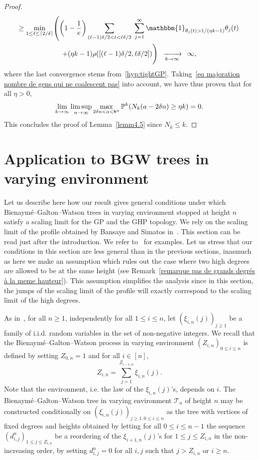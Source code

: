 \documentclass[10pt]{amsart}
\theoremstyle{definition}\newtheorem{defi}[theo]{Definition}\newtheorem{rema}[theo]{Remark}\newtheorem{exam}[theo]{Example}\newtheorem{exem}[theo]{Example}\newtheorem{nota}[theo]{Notation}
\newcommand{\cv}[1][n]{\enskip\xrightarrow[#1 \to \infty]{}\enskip}
\renewcommand{\P}{{\mathbb{P}}}
\newcommand{\1}{\mathbbm{1}}
\newcommand{\T}{\mathcal{T}}
\newcommand{\h}{\mathsf{h}}
\let\originalleft\left
\let\originalright\right
\renewcommand{\left}{\mathopen{}\mathclose\bgroup\originalleft}
\renewcommand{\right}{\aftergroup\egroup\originalright}
\renewcommand*{\to}{\mathchoice{\longrightarrow}{\rightarrow}{\rightarrow}{\rightarrow}}
\begin{document}
\begin{proof}
\begin{multline*}
\ge \min_{1 \le \ell \le \lceil 2/\delta \rceil}
\left(\left(1-\frac{1}{e} \right) \sum_{(\ell-1) \delta/2 < t < \ell \delta/2} \;\sum_{j=1}^\infty \1_{\theta_j(t)>1/(\eta k-1)} \theta_j(t)\right.\\
+ (\eta k-1) \rho([(\ell-1)\delta/2, \ell \delta/2])
\Biggr)\cv[k] \infty,
\end{multline*}
where the last convergence stems from~\ref{hyp:tightGP}. Taking~\eqref{eq majoration nombre de gens qui ne coalescent pas} into account, we have thus proven that for all $\eta>0$,
\[
\lim_{k\to \infty} \limsup_{n \to \infty} \max_{2 \delta n <a < \h^n} \P^k(N_k(a-2\delta n) \ge \eta k) = 0.
\]
This concludes the proof of Lemma~\ref{lemm4.5} since $N_k \le k$.
\end{proof}

\section{Application to BGW trees in varying environment} \label{sec:appBGWTVE}

Let us describe here how our result gives general conditions under which Bienaymé--Galton--Watson trees in varying environment stopped at height $n$ satisfy a scaling limit for the GP and the GHP topology. We rely on the scaling limit of the profile obtained by Bansaye and Simatos in~\cite{BS15}. This section can be read just after the introduction. We refer to~\cite{BS15} for examples. {Let us stress that our conditions in this section are less general than in the previous sections, inasmuch as here we make an assumption which rules out the case where two high degrees are allowed to be at the same height (see Remark~\ref{remarque pas de grands degrés à la meme hauteur}). This assumption simplifies the analysis since in this section, the jumps of the scaling limit of the profile will exactly correspond to the scaling limit of the high degrees.}

As in~\cite{BS15}, for all $n \ge 1$, independently for all $1 \le i \le n$, let $(\xi_{i,n}(j))_{j\ge 1}$ be a family of i.i.d. random variables in the set of non-negative integers. We recall that the Bienaymé--Galton--Watson process in varying environment $(Z_{i,n})_{0 \le i \le n}$ is defined by setting $Z_{0,n}=1$ and for all $i \in [n]$,
\[
Z_{i,n} = \sum_{j=1}^{Z_{i-1,n}} \xi_{i,n}(j).
\]
Note that the environment, i.e. the law of the $\xi_{i,n}(j)$'s, depends on $i$. The Bienaymé--Galton--Watson tree in varying environment $\T_n$ of height $n$ may be constructed conditionally on $(\xi_{i,n}(j))_{j\ge 1, 0 \le i \le n}$ as the tree with vertices of fixed degrees and heights obtained by letting for all $0 \le i\le n-1$ the sequence $(d_{i,j}^n)_{1 \le j \le Z_{i,n}}$ be a reordering of the $\xi_{i+1,n}(j)$'s for $1 \le j \le Z_{i,n}$ in the non-increasing order, by setting $d^n_{i,j}=0$ {for all $i,j$ such that} $j > Z_{i,n}$ or $i \ge n$.
\end{document}
